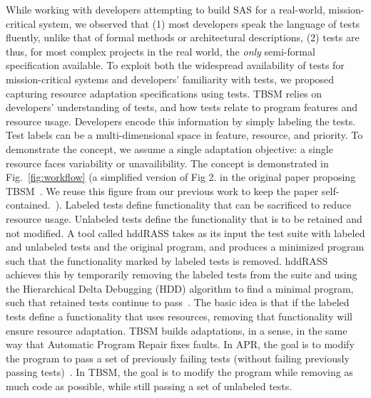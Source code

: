 While working with developers attempting to build SAS for a real-world, mission-critical system, we observed that (1) most developers speak the language of tests fluently, unlike that of formal methods or architectural descriptions,  (2) tests are thus, for most complex projects in the real world, the \emph{only} semi-formal specification available. To exploit both the widespread availability of tests for mission-critical systems and developers' familiarity with tests, we proposed capturing resource adaptation specifications using tests.
TBSM relies on developers' understanding of tests, and how tests relate to program features and resource usage. Developers encode this information by simply labeling the tests. Test labels can be a multi-dimensional space in feature, resource, and priority. To demonstrate the concept, we assume a single adaptation objective: a single resource faces variability or unavailibility. The concept is demonstrated in Fig.~\ref{fig:workflow} (a simplified version of Fig 2. in the original paper proposing TBSM~\cite{christi2017saso}. We reuse this figure from our previous work to keep the paper self-contained.~\cite{christi2019qrs}). Labeled tests define functionality that can be sacrificed to reduce resource usage. Unlabeled tests define the functionality that is to be retained and not modified. A tool called hddRASS takes as its input the test suite with labeled and unlabeled tests and the original program, and produces a minimized program such that the functionality marked by labeled tests is removed. hddRASS achieves this by temporarily removing the labeled tests from the suite and using the Hierarchical Delta Debugging (HDD) algorithm to find a minimal program, such that retained tests continue to pass~\cite{misherghi2006hdd}. The basic idea is that if the labeled tests define a functionality that uses resources, removing that functionality will ensure resource adaptation. TBSM builds adaptations, in a sense, in the same way that Automatic Program Repair fixes faults. In APR, the goal is to modify the program to pass a set of previously failing tests (without failing previously passing tests)~\cite{monperrus2018asr}. In TBSM, the goal is to modify the program while removing as much code as possible, while still passing a set of unlabeled tests.

